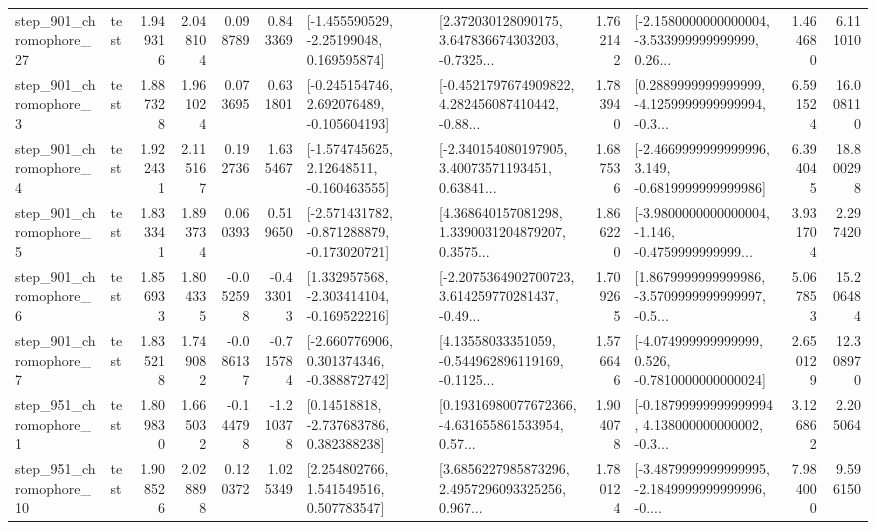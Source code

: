 \begin{tabular}{llrrrrllrlrr}
  step\_901\_chromophore\_27 &      test &      1.949316 &    2.048104 &      0.098789 &  0.843369 &    [-1.455590529, -2.25199048, 0.169595874] &  [2.372030128090175, 3.647836674303203, -0.7325... &       1.762142 &  [-2.1580000000000004, -3.533999999999999, 0.26... &            1.464680 &          6.111010 \\
   step\_901\_chromophore\_3 &      test &      1.887328 &    1.961024 &      0.073695 &  0.631801 &   [-0.245154746, 2.692076489, -0.105604193] &  [-0.4521797674909822, 4.282456087410442, -0.88... &       1.783940 &  [0.2889999999999999, -4.1259999999999994, -0.3... &            6.591524 &         16.008110 \\
   step\_901\_chromophore\_4 &      test &      1.922431 &    2.115167 &      0.192736 &  1.635467 &    [-1.574745625, 2.12648511, -0.160463555] &  [-2.340154080197905, 3.40073571193451, 0.63841... &       1.687536 &  [-2.4669999999999996, 3.149, -0.6819999999999986] &            6.394045 &         18.800298 \\
   step\_901\_chromophore\_5 &      test &      1.833341 &    1.893734 &      0.060393 &  0.519650 &  [-2.571431782, -0.871288879, -0.173020721] &  [4.368640157081298, 1.3390031204879207, 0.3575... &       1.866220 &  [-3.9800000000000004, -1.146, -0.4759999999999... &            3.931704 &          2.297420 \\
   step\_901\_chromophore\_6 &      test &      1.856933 &    1.804335 &     -0.052598 & -0.433013 &   [1.332957568, -2.303414104, -0.169522216] &  [-2.2075364902700723, 3.614259770281437, -0.49... &       1.709265 &  [1.8679999999999986, -3.5709999999999997, -0.5... &            5.067853 &         15.206484 \\
   step\_901\_chromophore\_7 &      test &      1.835218 &    1.749082 &     -0.086137 & -0.715784 &   [-2.660776906, 0.301374346, -0.388872742] &  [4.13558033351059, -0.544962896119169, -0.1125... &       1.576646 &   [-4.074999999999999, 0.526, -0.7810000000000024] &            2.650129 &         12.308970 \\
   step\_951\_chromophore\_1 &      test &      1.809830 &    1.665032 &     -0.144798 & -1.210378 &     [0.14518818, -2.737683786, 0.382388238] &  [0.19316980077672366, -4.631655861533954, 0.57... &       1.904078 &  [-0.18799999999999994, 4.138000000000002, -0.3... &            3.126862 &          2.205064 \\
  step\_951\_chromophore\_10 &      test &      1.908526 &    2.028898 &      0.120372 &  1.025349 &     [2.254802766, 1.541549516, 0.507783547] &  [3.6856227985873296, 2.4957296093325256, 0.967... &       1.780124 &  [-3.4879999999999995, -2.1849999999999996, -0.... &            7.984000 &          9.596150 \\

\end{tabular}
